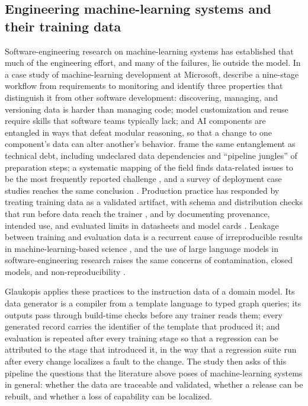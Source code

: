 \documentclass[a4paper,fleqn]{cas-dc}
\begin{document}
\subsection{Engineering machine-learning systems and their training data}\label{sec:bg-se}
Software-engineering research on machine-learning systems has established that much of the engineering effort, and many of the failures, lie outside the model. In a case study of machine-learning development at Microsoft, \citet{amershi2019se4ml} describe a nine-stage workflow from requirements to monitoring and identify three properties that distinguish it from other software development: discovering, managing, and versioning data is harder than managing code; model customization and reuse require skills that software teams typically lack; and AI components are entangled in ways that defeat modular reasoning, so that a change to one component's data can alter another's behavior. \citet{sculley2015hidden} frame the same entanglement as technical debt, including undeclared data dependencies and ``pipeline jungles'' of preparation steps; a systematic mapping of the field finds data-related issues to be the most frequently reported challenge \citep{martinez2022se4ai}, and a survey of deployment case studies reaches the same conclusion \citep{paleyes2022challenges}. Production practice has responded by treating training data as a validated artifact, with schema and distribution checks that run before data reach the trainer \citep{breck2019datavalidation}, and by documenting provenance, intended use, and evaluated limits in datasheets and model cards \citep{gebru2021datasheets,mitchell2019modelcards}. Leakage between training and evaluation data is a recurrent cause of irreproducible results in machine-learning-based science \citep{kapoor2023leakage}, and the use of large language models in software-engineering research raises the same concerns of contamination, closed models, and non-reproducibility \citep{sallou2024breaking}.

Glaukopis applies these practices to the instruction data of a domain model. Its data generator is a compiler from a template language to typed graph queries; its outputs pass through build-time checks before any trainer reads them; every generated record carries the identifier of the template that produced it; and evaluation is repeated after every training stage so that a regression can be attributed to the stage that introduced it, in the way that a regression suite run after every change localizes a fault to the change. The study then asks of this pipeline the questions that the literature above poses of machine-learning systems in general: whether the data are traceable and validated, whether a release can be rebuilt, and whether a loss of capability can be localized.
\end{document}
